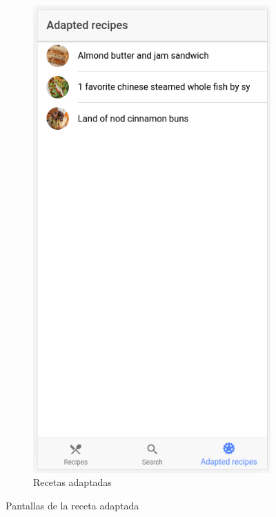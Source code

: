 \begin{figure}[H]
\begin{subfigure}[b]{0.32\linewidth}
        \label{fig:app_9}
    \end{subfigure}
        \begin{subfigure}[b]{0.32\linewidth}
        \includegraphics[width=\linewidth]{imagenes/app/pantallas/app_10.png}
        \caption{Recetas adaptadas}
        \label{fig:app_10}
    \end{subfigure}
    \caption{Pantallas de la receta adaptada}
    \label{fig:pantallas_inicio5}
\end{figure}
